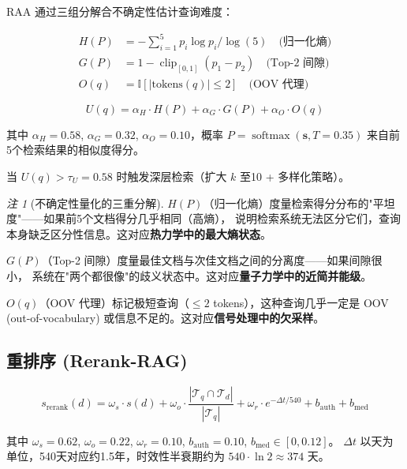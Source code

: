 \documentclass[11pt,a4paper]{ctexart}
\theoremstyle{remark}
\newtheorem{remark}{注}[section]
\DeclareMathOperator{\softmax}{softmax}
\DeclareMathOperator{\clip}{clip}
\begin{document}
RAA 通过三组分解合不确定性估计查询难度：

\begin{align}
H(P) &= -\sum_{i=1}^{5} p_i \log p_i / \log(5) \quad \text{(归一化熵)} \\
G(P) &= 1 - \clip_{[0,1]}(p_1 - p_2) \quad \text{(Top-2 间隙)} \\
O(q) &= \mathbb{I}[|\text{tokens}(q)| \leq 2] \quad \text{(OOV 代理)}
\end{align}

\begin{equation}
U(q) = \alpha_H \cdot H(P) + \alpha_G \cdot G(P) + \alpha_O \cdot O(q)
\label{eq:uncertainty}
\end{equation}

其中 $\alpha_H = 0.58$, $\alpha_G = 0.32$, $\alpha_O = 0.10$，概率 $P = \softmax(\mathbf{s}, T=0.35)$ 来自前5个检索结果的相似度得分。

当 $U(q) > \tau_U = 0.58$ 时触发深层检索（扩大 $k$ 至10 + 多样化策略）。

\begin{remark}[不确定性量化的三重分解]
$H(P)$（归一化熵）度量检索得分分布的"平坦度"——如果前5个文档得分几乎相同（高熵），
说明检索系统无法区分它们，查询本身缺乏区分性信息。这对应\textbf{热力学中的最大熵状态}。

$G(P)$（Top-2 间隙）度量最佳文档与次佳文档之间的分离度——如果间隙很小，
系统在"两个都很像"的歧义状态中。这对应\textbf{量子力学中的近简并能级}。

$O(q)$（OOV 代理）标记极短查询（$\leq 2$ tokens），这种查询几乎一定是
OOV (out-of-vocabulary) 或信息不足的。这对应\textbf{信号处理中的欠采样}。
\end{remark}

\subsection{重排序 (Rerank-RAG)}

\begin{equation}
s_{\text{rerank}}(d) = \omega_s \cdot s(d) + \omega_o \cdot \frac{|\mathcal{T}_q \cap \mathcal{T}_d|}{|\mathcal{T}_q|} + \omega_r \cdot e^{-\Delta t / 540} + b_{\text{auth}} + b_{\text{med}}
\label{eq:rerank}
\end{equation}

其中 $\omega_s=0.62$, $\omega_o=0.22$, $\omega_r=0.10$, $b_{\text{auth}}=0.10$, $b_{\text{med}} \in [0, 0.12]$。
$\Delta t$ 以天为单位，540天对应约1.5年，时效性半衰期约为 $540 \cdot \ln 2 \approx 374$ 天。
\end{document}
